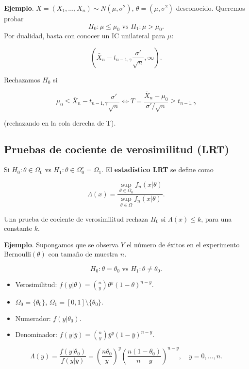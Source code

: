 \documentclass[
  12pt,
]{book}
\begin{document}
\textbf{Ejemplo}. \(X = (X_1,\dots, X_n)\sim N(\mu,\sigma^2)\), \(\theta = (\mu,\sigma^2)\) desconocido. Queremos probar
\[ H_0: \mu \leq \mu_0 \text{ vs } H_1: \mu > \mu_0.\]
Por dualidad, basta con conocer un IC unilateral para \(\mu\):

\[ \left(\bar X_n-t_{n-1,\gamma}\dfrac{\sigma'}{\sqrt n},\infty\right).\]

Rechazamos \(H_0\) si

\[\mu_0\leq \bar X_n-t_{n-1,\gamma}\dfrac{\sigma'}{\sqrt n} \Leftrightarrow T = \dfrac{\bar X_n -\mu_0}{\sigma'/\sqrt n}\geq t_{n-1,\gamma}\]

(rechazando en la cola derecha de T).

\hypertarget{pruebas-de-cociente-de-verosimilitud-lrt}{%
\subsection{Pruebas de cociente de verosimilitud (LRT)}\label{pruebas-de-cociente-de-verosimilitud-lrt}}

Si \(H_0:\theta \in \Omega_0\) vs \(H_1: \theta \in \Omega_0^c = \Omega_1\). El \textbf{estadístico LRT} se define como

\[\Lambda (x) = \dfrac{\sup_{\theta\in \Omega_0} f_n(x|\theta)}{\sup_{\theta\in \Omega} f_n(x|\theta)}.\]

Una prueba de cociente de verosimilitud rechaza \(H_0\) si \(\Lambda(x)\leq k\), para una constante \(k\).

\textbf{Ejemplo}. Supongamos que se observa \(Y\) el número de éxitos en el experimento \(\text{Bernoulli}(\theta)\) con tamaño de muestra \(n\).

\[H_0: \theta = \theta_0 \text{ vs } H_1: \theta\ne\theta_0.\]

\begin{itemize}
\item
  Verosimilitud: \(f(y|\theta) = {n\choose y}\theta ^y(1-\theta)^{n-y}\).
\item
  \(\Omega_0 = \{\theta_0\}\), \(\Omega_1 = [0,1]\setminus \{\theta_0\}\).
\item
  Numerador: \(f(y|\theta_0)\).
\item
  Denominador: \(f(y|\bar y) = \displaystyle{n\choose y}{\bar y}^{y}(1-\bar y)^{n-y}\).
\end{itemize}

\[\Lambda(y) = \dfrac{f(y|\theta_0)}{f(y|\bar y)} = \left(\dfrac{n\theta_0}{y}\right)^y\left(\dfrac{n(1-\theta_0)}{n-y}\right)^{n-y}, \quad y=0,\dots,n.\]
\end{document}
